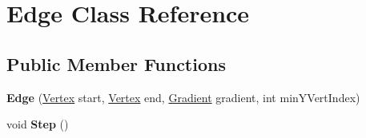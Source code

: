 \hypertarget{class_edge}{}\section{Edge Class Reference}
\label{class_edge}
\subsection*{Public Member Functions}
\begin{DoxyCompactItemize}
\item 
\hypertarget{class_edge_a97a820beb3ce7430825616b227189845}{}{\bfseries Edge} (\hyperlink{struct_vertex}{Vertex} start, \hyperlink{struct_vertex}{Vertex} end, \hyperlink{class_gradient}{Gradient} gradient, int min\+Y\+Vert\+Index)\label{class_edge_a97a820beb3ce7430825616b227189845}

\item 
\hypertarget{class_edge_aee421bbd01b0ac8006e91e76589e84fb}{}void {\bfseries Step} ()\label{class_edge_aee421bbd01b0ac8006e91e76589e84fb}

\end{DoxyCompactItemize}
